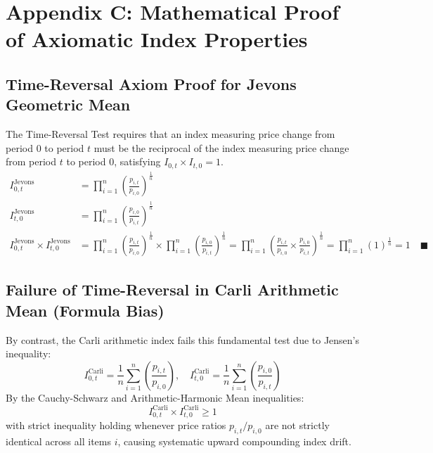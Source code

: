 \section*{Appendix C: Mathematical Proof of Axiomatic Index Properties}

\subsection*{Time-Reversal Axiom Proof for Jevons Geometric Mean}
\hs The Time-Reversal Test requires that an index measuring price change from period $0$ to period $t$ must be the reciprocal of the index measuring price change from period $t$ to period $0$, satisfying $I_{0,t} \times I_{t,0} = 1$.
\begin{align}
    I_{0,t}^{\text{Jevons}} &= \prod_{i=1}^n \left( \frac{p_{i,t}}{p_{i,0}} \right)^{\frac{1}{n}} \\
    I_{t,0}^{\text{Jevons}} &= \prod_{i=1}^n \left( \frac{p_{i,0}}{p_{i,t}} \right)^{\frac{1}{n}} \\
    I_{0,t}^{\text{Jevons}} \times I_{t,0}^{\text{Jevons}} &= \prod_{i=1}^n \left( \frac{p_{i,t}}{p_{i,0}} \right)^{\frac{1}{n}} \times \prod_{i=1}^n \left( \frac{p_{i,0}}{p_{i,t}} \right)^{\frac{1}{n}} = \prod_{i=1}^n \left( \frac{p_{i,t}}{p_{i,0}} \times \frac{p_{i,0}}{p_{i,t}} \right)^{\frac{1}{n}} = \prod_{i=1}^n (1)^{\frac{1}{n}} = 1 \quad \blacksquare
\end{align}

\subsection*{Failure of Time-Reversal in Carli Arithmetic Mean (Formula Bias)}
\hs By contrast, the Carli arithmetic index fails this fundamental test due to Jensen's inequality:
\begin{equation}
    I_{0,t}^{\text{Carli}} = \frac{1}{n}\sum_{i=1}^n \left( \frac{p_{i,t}}{p_{i,0}} \right), \quad I_{t,0}^{\text{Carli}} = \frac{1}{n}\sum_{i=1}^n \left( \frac{p_{i,0}}{p_{i,t}} \right)
\end{equation}
\hs By the Cauchy-Schwarz and Arithmetic-Harmonic Mean inequalities:
\begin{equation}
    I_{0,t}^{\text{Carli}} \times I_{t,0}^{\text{Carli}} \ge 1
\end{equation}
with strict inequality holding whenever price ratios $p_{i,t}/p_{i,0}$ are not strictly identical across all items $i$, causing systematic upward compounding index drift.

